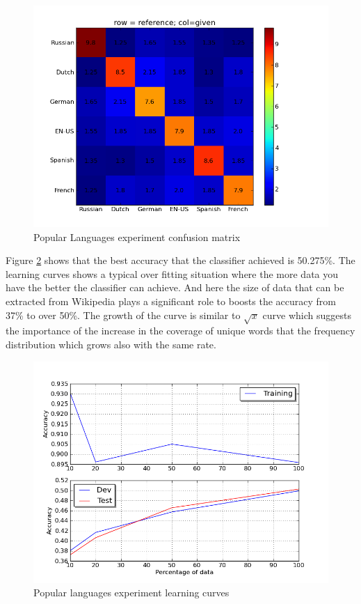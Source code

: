 \documentclass[11pt]{article}
\begin{document}
\begin{figure}[htp]
\centering
\includegraphics[scale=0.45]{popular_cfm.png}
\caption{Popular Languages experiment confusion matrix}
\label{pop_cfm}
\end{figure}

Figure \ref{pop_lc} shows that the best accuracy that the classifier achieved is 50.275\%. The learning curves shows a typical over fitting situation where the more data you have the better the classifier can achieve. And here the size of data that can be extracted from Wikipedia plays a significant role to boosts the accuracy from 37\% to over 50\%. The growth of the curve is similar to $\sqrt{x}$ curve which suggests the importance of the increase in the coverage of unique words that the frequency distribution which grows also with the same rate.


\begin{figure}[htp]
\centering
\includegraphics[scale=0.45]{popular_lc.png}
\caption{Popular languages experiment learning curves}
\label{pop_lc}
\end{figure}
		
\end{document}
